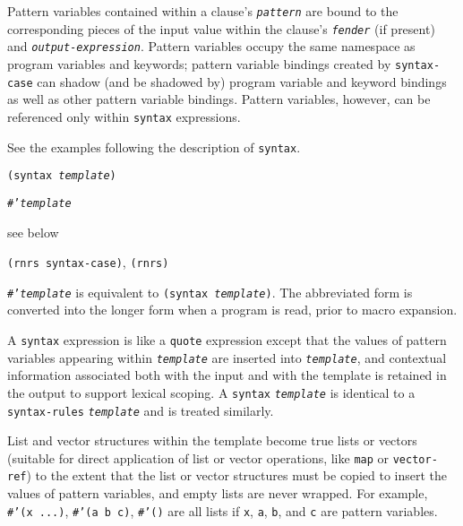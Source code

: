 \label{syntax_s32}Pattern variables contained within a clause's
\texttt{\textit{pattern}} are bound to the corresponding pieces of the input
value within the clause's \texttt{\textit{fender}} (if present) and
\texttt{\textit{output-expression}}.
Pattern variables occupy the same namespace as program variables and
keywords; pattern variable bindings created by \texttt{syntax-case}
can shadow (and be shadowed by) program variable and keyword bindings as
well as other pattern variable bindings.
Pattern variables, however, can be referenced only within \texttt{syntax}
expressions.


See the examples following the description of \texttt{syntax}.

\begin{description}

\label{syntax_s33}\item[syntax] \texttt{(syntax \textit{template})}



\item[syntax] \texttt{\#{}'\textit{template}}



\item[returns] see below


\item[libraries] \texttt{(rnrs syntax-case)}, \texttt{(rnrs)}
\end{description}

\texttt{\#{}'\textit{template}} is equivalent to \texttt{(syntax \textit{template})}.
The abbreviated form is converted into the longer form when a program
is read, prior to macro expansion.

A \texttt{syntax} expression is like a \texttt{quote} expression except that the
values of pattern variables appearing within \texttt{\textit{template}} are
inserted into \texttt{\textit{template}}, and
contextual information associated both with the input and with the template is
retained in the output to support lexical scoping.
A \texttt{syntax} \texttt{\textit{template}} is identical to a \texttt{syntax-rules}
\texttt{\textit{template}} and is treated similarly.


List and vector structures within the template become true lists or
vectors (suitable for direct application of list or vector operations,
like \texttt{map} or \texttt{vector-ref}) to the extent that the
list or vector structures must be copied to insert the values of
pattern variables, and empty lists are never wrapped.
For example, \texttt{\#{}'(x ...)}, \texttt{\#{}'(a b c)}, \texttt{\#{}'()} are
all lists if \texttt{x}, \texttt{a}, \texttt{b}, and \texttt{c} are
pattern variables.


